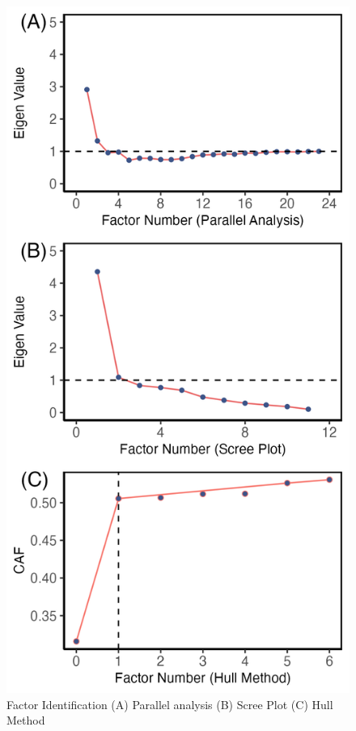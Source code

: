 \documentclass[
  man]{apa6}
\begin{document}
\begin{figure}

{\centering \includegraphics[width=1\linewidth,height=1\textheight]{Figures/300/Figure2} 

}

\caption{Factor Identification (A) Parallel analysis (B) Scree Plot (C) Hull Method}\label{fig:facIdFig}
\end{figure}
\end{document}
